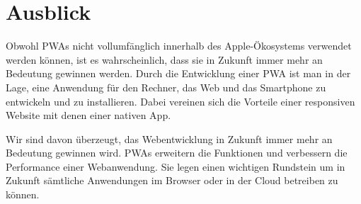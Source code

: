 \chapter{Ausblick}
Obwohl PWAs nicht vollumfänglich innerhalb des Apple-Ökosystems verwendet werden können, ist es wahrscheinlich, dass sie in Zukunft immer mehr an Bedeutung gewinnen werden. Durch die Entwicklung einer PWA ist man in der Lage, eine Anwendung für den Rechner, das Web und das Smartphone zu entwickeln und zu installieren. Dabei vereinen sich die Vorteile einer responsiven Website mit denen einer nativen App.

Wir sind davon überzeugt, das Webentwicklung in Zukunft immer mehr an Bedeutung gewinnen wird. PWAs erweitern die Funktionen und verbessern die Performance einer Webanwendung. Sie legen einen wichtigen Rundstein um in Zukunft sämtliche Anwendungen im Browser oder in der Cloud betreiben zu können. 
